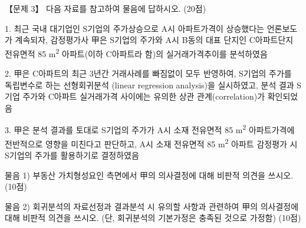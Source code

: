 \begin{longquestion}{【문제 3】}
다음 자료를 참고하여 물음에 답하시오. (20점) \par
\begin{framedtext}
1. 최근 국내 대기업인 S기업의 주가상승으로 A시 아파트가격이 상승했다는 언론보도가 계속되자, 감정평가사 甲은 S기업의 주가와 A시 B동의 대표 단지인 C아파트단지 전유면적 85 m\textsuperscript{2} 아파트(이하 C아파트라 함)의 실거래가격추이를 분석하였음 \par
2. 甲은 C아파트의 최근 3년간 거래사례를 빠짐없이 모두 반영하여, S기업의 주가를 독립변수로 하는 선형회귀분석 (linear regression analysis)을 실시하였고, 분석 결과 S기업 주가와 C아파트 실거래가격 사이에는 유의한 상관 관계(correlation)가 확인되었음 \par
3. 甲은 분석 결과를 토대로 S기업의 주가가 A시 소재 전유면적 85 m\textsuperscript{2} 아파트가격에 전반적으로 영향을 미친다고 판단하고, A시 소재 전유면적 85 m\textsuperscript{2} 아파트 감정평가 시 S기업의 주가를 활용하기로 결정하였음 \par
\end{framedtext}
\medskip\noindent 물음 1) 부동산 가치형성요인 측면에서 甲의 의사결정에 대해 비판적 의견을 쓰시오. (10점) \par
\medskip\noindent 물음 2) 회귀분석의 자료선정과 결과분석 시 유의할 사항과 관련하여 甲의 의사결정에 대해 비판적 의견을 쓰시오. (단, 회귀분석의 기본가정은 충족된 것으로 가정함) (10점) \par
\end{longquestion}
